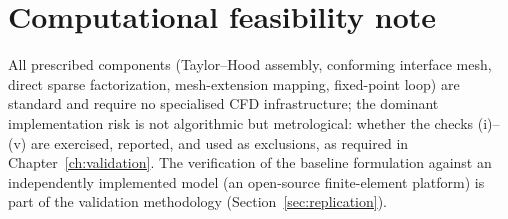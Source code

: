 \section{Computational feasibility note}
All prescribed components (Taylor--Hood assembly, conforming interface mesh, direct sparse
factorization, mesh-extension mapping, fixed-point loop) are standard and require no specialised
CFD infrastructure; the dominant implementation risk is not algorithmic but metrological: whether
the checks (i)--(v) are exercised, reported, and used as exclusions, as required in
Chapter~\ref{ch:validation}. The verification of the baseline formulation against an independently
implemented model (an open-source finite-element platform) is part of the validation methodology
(Section~\ref{sec:replication}).
